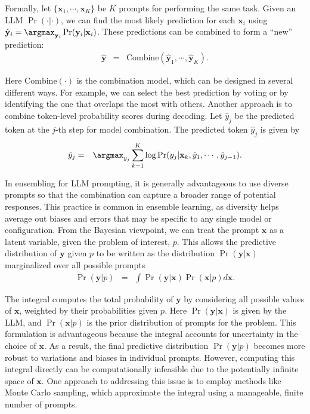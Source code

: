 Formally, let $\{\mathbf{x}_1,\cdots,\mathbf{x}_K\}$ be $K$ prompts for performing the same task. Given an LLM $\Pr(\cdot|\cdot)$, we can find the most likely prediction for each $\mathbf{x}_i$ using $\hat{\mathbf{y}}_i= \argmax_{\mathbf{y}_i} \Pr(\mathbf{y}_i|\mathbf{x}_i)$. These predictions can be combined to form a ``new'' prediction:
\begin{eqnarray}
\hat{\mathbf{y}} & = & \mathrm{Combine}(\hat{\mathbf{y}}_1,\cdots,\hat{\mathbf{y}}_K). \label{eq:llm-combination-with-diff-prompts}
\end{eqnarray}

\noindent Here $\mathrm{Combine}(\cdot)$ is the combination model, which can be designed in several different ways. For example, we can select the best prediction by voting or by identifying the one that overlaps the most with others. Another approach is to combine token-level probability scores during decoding. Let $\hat{y}_{j}$ be the predicted token at the $j$-th step for model combination. The predicted token $\hat{y}_{j}$ is given by
\begin{eqnarray}
\hat{y}_{j} & = & \argmax_{y_j} \sum_{k=1}^{K} \log \Pr(y_j|\mathbf{x}_k,\hat{y}_1,\cdots,\hat{y}_{j-1}).
\end{eqnarray}

In ensembling for LLM prompting, it is generally advantageous to use diverse prompts so that the combination can capture a broader range of potential responses. This practice is common in ensemble learning, as diversity helps average out biases and errors that may be specific to any single model or configuration. From the Bayesian viewpoint, we can treat the prompt $\mathbf{x}$ as a latent variable, given the problem of interest, $p$. This allows the predictive distribution of $\mathbf{y}$ given $p$ to be written as the distribution $\Pr(\mathbf{y}|\mathbf{x})$ marginalized over all possible prompts
\begin{eqnarray}
\Pr(\mathbf{y}|p) & = & \int \Pr(\mathbf{y}|\mathbf{x}) \Pr(\mathbf{x}|p) d \mathbf{x}.
\end{eqnarray}

\noindent The integral computes the total probability of $\mathbf{y}$ by considering all possible values of $\mathbf{x}$, weighted by their probabilities given $p$. Here $\Pr(\mathbf{y}|\mathbf{x})$ is given by the LLM, and $\Pr(\mathbf{x}|p)$ is the prior distribution of prompts for the problem. This formulation is advantageous because the integral accounts for uncertainty in the choice of $\mathbf{x}$. As a result, the final predictive distribution $\Pr(\mathbf{y}|p)$ becomes more robust to variations and biases in individual prompts. However, computing this integral directly can be computationally infeasible due to the potentially infinite space of $\mathbf{x}$. One approach to addressing this issue is to employ methods like Monte Carlo sampling, which approximate the integral using a manageable, finite number of prompts.

